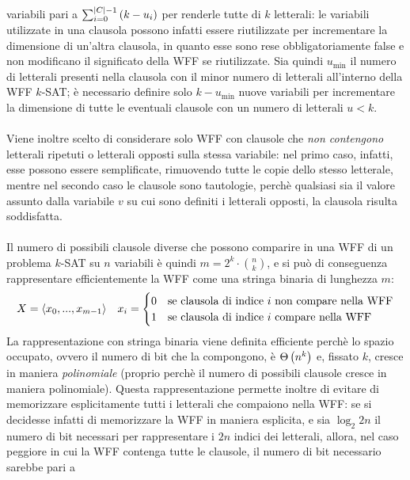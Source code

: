 variabili pari a $\sum_{i = 0}^{|C|-1} \left(k-u_i\right)$ per renderle tutte di $k$ letterali:
le variabili utilizzate in una clausola possono infatti essere riutilizzate per
incrementare la dimensione di un'altra clausola, in quanto esse sono rese
obbligatoriamente false e non modificano il significato della WFF se riutilizzate.
Sia quindi $u_{\min}$ il numero di letterali presenti nella clausola con il minor numero di letterali all'interno della WFF $k$-SAT; è necessario definire solo $k - u_{\min}$ nuove
variabili per incrementare la dimensione di tutte le eventuali clausole con un numero di letterali $u < k$.\\
\\
Viene inoltre scelto di considerare solo WFF con clausole che \textit{non contengono} letterali ripetuti
o letterali opposti sulla stessa variabile: nel primo caso, infatti, esse possono essere semplificate, rimuovendo tutte le copie dello stesso letterale, mentre nel secondo caso le clausole sono tautologie, perchè qualsiasi sia il valore assunto dalla variabile $v$ su cui sono definiti i letterali opposti, la clausola risulta soddisfatta.\\
\\
Il numero di possibili clausole diverse che possono comparire in una WFF di un problema $k$-SAT
su $n$ variabili è quindi $m = 2^k \cdot \binom{n}{k}$, e si può di conseguenza rappresentare efficientemente la WFF come una stringa binaria di lunghezza $m$:
\begin{equation*}
    X = \langle x_0, ..., x_{m-1}\rangle \quad
    x_i = \begin{cases}
        0 & \textnormal{se clausola di indice } i \textnormal{ non compare nella WFF} \\
        1 & \textnormal{se clausola di indice } i \textnormal{ compare nella WFF}
    \end{cases}
\end{equation*}
La rappresentazione con stringa binaria viene definita efficiente perchè lo spazio
occupato, ovvero il numero di bit che la compongono, è $\Theta \left(n^k\right)$ e, fissato $k$, cresce in maniera 
\textit{polinomiale} (proprio perchè il numero di possibili clausole cresce in 
maniera polinomiale).
Questa rappresentazione permette inoltre di evitare di memorizzare esplicitamente tutti i 
letterali che compaiono nella WFF: se si decidesse infatti di memorizzare la WFF in maniera esplicita, e sia $\log_2 2n$ il numero di bit necessari per rappresentare i $2n$ indici dei letterali, 
allora, nel caso peggiore in cui la WFF contenga
tutte le clausole, il numero di bit necessario sarebbe pari a 
